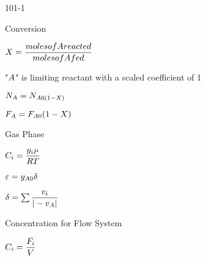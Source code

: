 \begin{mitframe}{101-1}
\begin{listone}
	\item Conversion
    \begin{listtwo}
    	\item $X=\dfrac{moles of \helmholtz reacted }{moles of \helmholtz fed}$
      \begin{listtwo}
        	\item "$\helmholtz$" is limiting reactant with a scaled coefficient of 1
            \item $\av=\nummoles_{\helmholtz\init(1-X)}$
            \item $\force_{\helmholtz}=\force_{\helmholtz\init}(1-X)$
        \end{listtwo}
    \end{listtwo}
	\item Gas Phase
    	\begin{listtwo}
        	\item $\conc_{\state}=\dfrac{y_{\state\p}}{\gasconst\Temp}$
            \item $\varepsilon=y_{\helmholtz\init}\blthick$
            \item $\blthick=\sum\nolimits\dfrac{\vvel_{\state}}{|-\vvel_{\helmholtz}|}$
        \end{listtwo}
	\item Concentration for Flow System
    	\begin{listtwo}
        		\item $\conc_{\state}=\dfrac{\force_{\state}}{\vol}$
        \end{listtwo}
\end{listone}
\end{mitframe}